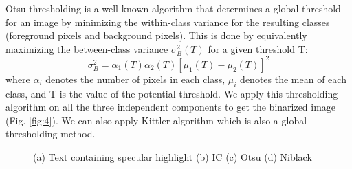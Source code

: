 Otsu thresholding \cite{A2} is a well-known algorithm that
determines a global threshold for an image by minimizing 
the within-class variance for the resulting classes (foreground pixels 
and background pixels). This is
done by equivalently maximizing the between-class variance
$\sigma _{B}^{2}(T)$ for a given threshold T:
\begin{equation}
\sigma_{B}^{2}=\alpha_1(T)\alpha_2(T)[\mu_1(T)-\mu_2(T)]^2 
\end{equation}
where $\alpha_i$ denotes the number of pixels in each class, $\mu_i$ denotes 
the mean of each class, and T is the value of the potential threshold. 
We apply this thresholding algorithm on all the three independent components to get the binarized image (Fig. \ref{fig:4}).
We can also apply Kittler \cite{A5} algorithm which is also a global thresholding method.
\begin{figure}[tp]
\centering
{}
\caption
{(a) Text containing specular highlight (b) IC (c) Otsu (d) Niblack}
\label{fig:5}
\end{figure}

